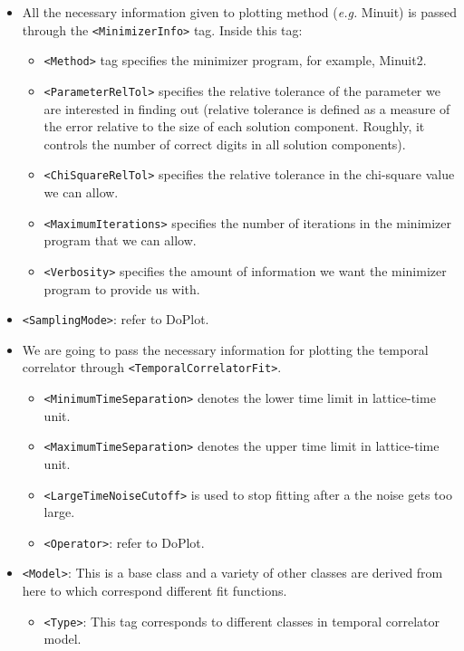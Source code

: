 \documentclass[12pt,notitlepage,letterpaper]{article}
\newcommand{\vb}{\texttt}
\begin{document}
\begin{itemize}
\item All the necessary information given to plotting method (\textit{e.g.} Minuit)
is passed through the \vb{<MinimizerInfo>} tag. Inside this tag:
\begin{itemize}
\item \vb{<Method>} tag specifies the minimizer program, for example, Minuit2.
\item \vb{<ParameterRelTol>} specifies the relative tolerance of the parameter we are interested in finding out (relative tolerance is defined as a measure of the error relative to the size of each solution component. Roughly, it controls the number of correct digits in all solution components).
\item \vb{<ChiSquareRelTol>} specifies the relative tolerance in the chi-square value we can allow.
\item \vb{<MaximumIterations>} specifies the number of iterations in the minimizer program that we can allow.
\item \vb{<Verbosity>} specifies the amount of information we want the minimizer program to provide us with.
\end{itemize}
\item \vb{<SamplingMode>}: refer to DoPlot.
\item We are going to pass the necessary information for plotting the temporal correlator through \vb{<TemporalCorrelatorFit>}.
\begin{itemize}
\item \vb{<MinimumTimeSeparation>} denotes  the lower time limit in lattice-time unit.
\item \vb{<MaximumTimeSeparation>} denotes the upper time limit in lattice-time unit.
\item \vb{<LargeTimeNoiseCutoff>} is used to stop fitting after a the noise gets too large.
\item \vb{<Operator>}: refer to DoPlot.
\end{itemize}
\item \vb{<Model>}: This is a base class and a variety of other classes are derived from here to which correspond different fit functions.
\begin{itemize}
\item \vb{<Type>}: This tag corresponds to different classes in temporal correlator model.
\end{itemize}
\end{itemize}
\end{document}
